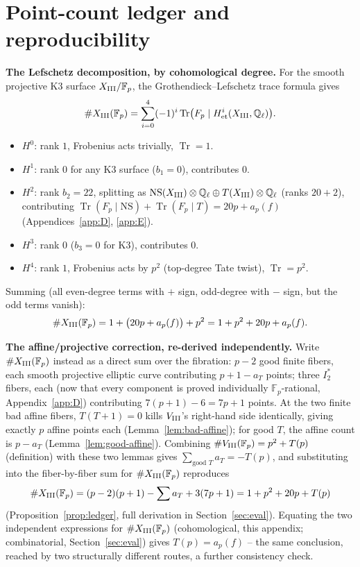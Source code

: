 \documentclass[11pt]{amsart}
\theoremstyle{definition}
\newcommand{\Fp}{\mathbb{F}_p}
\newcommand{\Q}{\mathbb{Q}}
\newcommand{\NS}{\mathrm{NS}}
\DeclareMathOperator{\Tr}{Tr}
\begin{document}
\section{Point-count ledger and reproducibility}
\label{app:F}

\textbf{The Lefschetz decomposition, by cohomological degree.} For the
smooth projective K3 surface $X_{\rm III}/\Fp$, the Grothendieck--Lefschetz
trace formula gives
\[
\#X_{\rm III}(\Fp) = \sum_{i=0}^{4}(-1)^i\Tr\bigl(F_p\mid H^i_{\rm et}(X_{\rm III},\Q_\ell)\bigr).
\]
\begin{itemize}
\item $H^0$: rank $1$, Frobenius acts trivially, $\Tr=1$.
\item $H^1$: rank $0$ for any K3 surface ($b_1=0$), contributes $0$.
\item $H^2$: rank $b_2=22$, splitting as $\NS(X_{\rm III})\otimes\Q_\ell
\oplus T(X_{\rm III})\otimes\Q_\ell$ (ranks $20+2$), contributing
$\Tr(F_p\mid\NS)+\Tr(F_p\mid T) = 20p+a_p(f)$ (Appendices~\ref{app:D},
\ref{app:E}).
\item $H^3$: rank $0$ ($b_3=0$ for K3), contributes $0$.
\item $H^4$: rank $1$, Frobenius acts by $p^2$ (top-degree Tate twist),
$\Tr=p^2$.
\end{itemize}
Summing (all even-degree terms with $+$ sign, odd-degree with $-$ sign,
but the odd terms vanish):
\[
\#X_{\rm III}(\Fp) = 1 + \bigl(20p+a_p(f)\bigr) + p^2 = 1+p^2+20p+a_p(f).
\]

\textbf{The affine/projective correction, re-derived independently.}
Write $\#X_{\rm III}(\Fp)$ instead as a direct sum over the fibration:
$p-2$ good finite fibers, each smooth projective elliptic curve
contributing $p+1-a_T$ points; three $I_2^*$ fibers, each (now that
every component is proved individually $\Fp$-rational,
Appendix~\ref{app:D}) contributing $7(p+1)-6=7p+1$ points. At the two
finite bad affine fibers, $T(T+1)=0$ kills $V_{\rm III}$'s right-hand
side identically, giving exactly $p$ affine points each
(Lemma~\ref{lem:bad-affine}); for good $T$, the affine count is $p-a_T$
(Lemma~\ref{lem:good-affine}). Combining $\#V_{\rm III}(\Fp)=p^2+T(p)$
(definition) with these two lemmas gives $\sum_{\text{good }T}a_T=-T(p)$,
and substituting into the fiber-by-fiber sum for $\#X_{\rm III}(\Fp)$
reproduces
\[
\#X_{\rm III}(\Fp) = (p-2)(p+1)-\sum a_T+3(7p+1) = 1+p^2+20p+T(p)
\]
(Proposition~\ref{prop:ledger}, full derivation in Section~\ref{sec:eval}).
Equating the two independent expressions for $\#X_{\rm III}(\Fp)$
(cohomological, this appendix; combinatorial, Section~\ref{sec:eval})
gives $T(p)=a_p(f)$ -- the same conclusion, reached by two structurally
different routes, a further consistency check.
\end{document}
